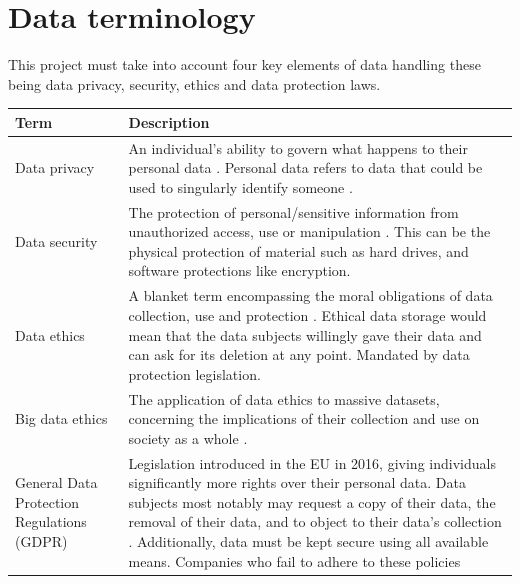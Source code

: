 \documentclass[12pt]{report}
\begin{document}




\section{Data terminology}\label{sec:dataTerms} %
This project must take into account four key elements of data handling these being data privacy, security, 
ethics and data protection laws. 

\begin{longtable}{ | p{} | p{} |}
    \hline
    \cellcolor{blue!25}Term & \cellcolor{blue!25}Description\\
    \hline
    Data privacy & An individual's ability to govern what happens to their personal data \autocite{cloudflare_what_nodate}. Personal data 
    refers to data that could be used to singularly identify someone \autocite{yang_big_2021}.\\
    \hline
    Data security & The protection of personal/sensitive information from unauthorized access, use or manipulation \autocite{ibm_security_2021}.
    This can be the physical protection of material such as hard drives, and software protections like encryption. \\
    \hline
    Data ethics & A blanket term encompassing the moral obligations of data collection, use and protection \autocite{harvard_business_school_5_2021}.
    Ethical data storage would mean that the data subjects willingly gave their data and can ask for its deletion at any point. 
    Mandated by data protection legislation. \\
    \hline 
    Big data ethics & The application of data ethics to massive datasets, concerning the implications of their collection and use on society as a whole
    \autocite{richards_big_2014}. \\ %
    \hline 
    General Data \newline Protection \newline Regulations (GDPR) & Legislation introduced in the EU in 2016, giving individuals significantly more 
    rights over their personal data. Data subjects most notably may request a copy of their data, the removal of their data, and to object to their data's 
    collection \autocite{ico_guide_2024}. Additionally, data must be kept secure using all available means. Companies who fail to adhere to these policies

\end{longtable}
\end{document}
